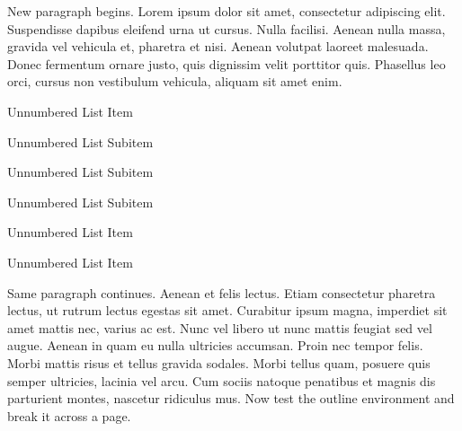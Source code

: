 New paragraph begins. Lorem ipsum dolor sit amet, consectetur adipiscing elit. Suspendisse dapibus eleifend urna ut cursus. Nulla facilisi. Aenean nulla massa, gravida vel vehicula et, pharetra et nisi. Aenean volutpat laoreet malesuada. Donec fermentum ornare justo, quis dignissim velit porttitor quis. Phasellus leo orci, cursus non vestibulum vehicula, aliquam sit amet enim. 
\begin{unnumlist}
\item{Unnumbered List Item}
\begin{unnumlist}
\item{Unnumbered List Subitem}
\item{Unnumbered List Subitem}
\item{Unnumbered List Subitem}
\end{unnumlist}
\item{Unnumbered List Item}
\item{Unnumbered List Item}
\end{unnumlist}
Same paragraph continues. Aenean et felis lectus. Etiam consectetur pharetra lectus, ut rutrum lectus egestas sit amet. Curabitur ipsum magna, imperdiet sit amet mattis nec, varius ac est. Nunc vel libero ut nunc mattis feugiat sed vel augue. Aenean in quam eu nulla ultricies accumsan. Proin nec tempor felis. Morbi mattis risus et tellus gravida sodales. Morbi tellus quam, posuere quis semper ultricies, lacinia vel arcu. Cum sociis natoque penatibus et magnis dis parturient montes, nascetur ridiculus mus. Now test the outline environment and break it across a page. 

